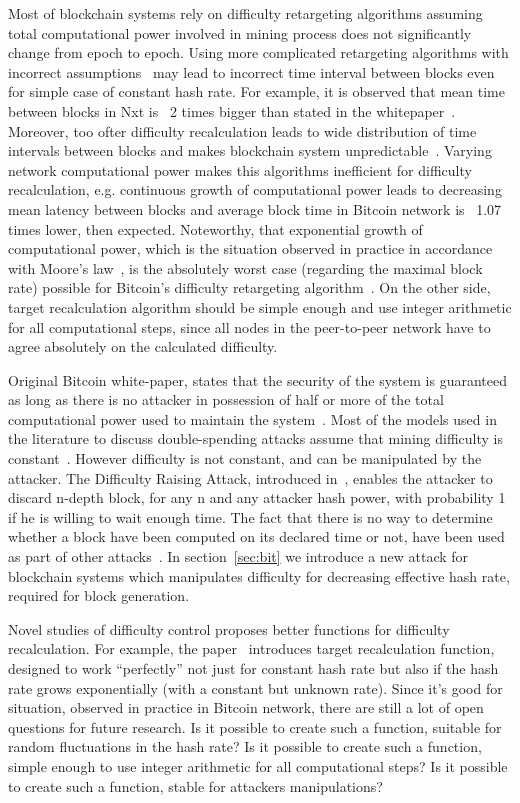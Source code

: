 \documentclass[number,preprint,review]{elsarticle}
\begin{document}
Most of blockchain systems rely on difficulty retargeting algorithms assuming total computational power involved in mining process does not significantly change from epoch to epoch.
Using more complicated retargeting algorithms with incorrect assumptions~\cite{andruiman2014} may lead to incorrect time interval between blocks even for simple case of constant hash rate. For example, it is observed that mean time between blocks in Nxt is ~2 times bigger than stated in the whitepaper~\cite{nxt}. Moreover, too ofter difficulty recalculation leads to wide distribution of time intervals between blocks and makes blockchain system unpredictable~\cite{andruiman2014}.
Varying network computational power makes this algorithms inefficient for difficulty recalculation, e.g. continuous growth of computational power leads to decreasing mean latency between blocks and average block time in Bitcoin network is ~1.07 times lower, then expected.
Noteworthy, that exponential growth of computational power, which is the situation observed in practice in accordance with Moore’s law~\cite{moore2006cramming}, is the absolutely worst case (regarding the maximal block rate) possible for Bitcoin’s difficulty retargeting algorithm~\cite{kraft2015difficulty}.
On the other side, target recalculation algorithm should be simple enough and use integer arithmetic for all computational steps, since all nodes in the peer-to-peer network have to agree absolutely on the calculated difficulty.

Original Bitcoin white-paper, states that the security of the system is guaranteed as long as there is no attacker in possession of half or more of the total computational power used to maintain the system~\cite{Nakamoto2008}.
Most of the models used in the literature to discuss double-spending attacks assume that mining difficulty is constant~\cite{??}.
However difficulty is not constant, and can be manipulated by the attacker.
The Difficulty Raising Attack, introduced in~\cite{bahack2013theoretical}, enables the attacker to discard n-depth block, for any n and any attacker hash power, with probability 1 if he is willing to wait enough time.
The fact that there is no way to determine whether a block have been computed on its declared time or not, have been used as part of other attacks~\cite{timejacking2011, artforz2011}.
In section~\ref{sec:bit} we introduce a new attack for blockchain systems which manipulates difficulty for decreasing effective hash rate, required for block generation.

Novel studies of difficulty control proposes better functions for difficulty recalculation.
For example, the paper~\cite{kraft2015difficulty} introduces target recalculation function, designed to work “perfectly” not just for constant hash rate but also if the hash rate grows exponentially (with a constant but unknown rate).
Since it's good for situation, observed in practice in Bitcoin network, there are still a lot of open questions for future research.
Is it possible to create such a function, suitable for random fluctuations in the hash rate?
Is it possible to create such a function, simple enough to use integer arithmetic for all computational steps?
Is it possible to create such a function, stable for attackers manipulations?
\end{document}

